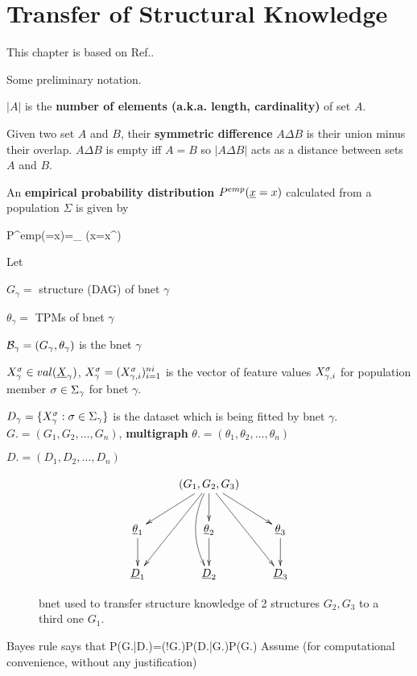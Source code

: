 \chapter{Transfer of Structural Knowledge}
\label{ch-transfer-struc}

This chapter is based on Ref.\cite{nic-transfer}.

Some preliminary notation.

$|A|$
is the {\bf number of elements (a.k.a. length, cardinality)} of set $A$.


Given two set $A$ and $B$, their 
{\bf symmetric difference} $A\Delta B$ is their union minus their overlap. $A\Delta B$ is empty iff $A=B$ so $|A\Delta B|$
acts as a distance between sets $A$ and $B$.

An {\bf empirical probability distribution} 
$P^{emp}(\rvx =x)$ calculated from a population $\Sigma$ is given by

\beq
P^{emp}(\rvx =x)=\sum_{\s\in \Sigma}
\indi(x=x^\s)
\eeq


Let 

$G_\gamma=$ structure (DAG)  of bnet $\gamma$

$\theta_\gamma=$ TPMs of bnet $\gamma$

${\cal B}_\gamma=(G_\gamma, \theta_\gamma)$ is the bnet $\gamma$

$X_\gamma^\s\in val(\rvX_\gamma)$, $X_\gamma^\sigma=(X_{\gamma, i}^\sigma)_{i=1}^{ni}$
is the vector of feature values 
$X_{\gamma, i}^\sigma$ for population member $\sigma\in\Sigma_\gamma$ for bnet $\gamma$.



$D_\gamma=\{X^\sigma_\gamma:\sigma\in \Sigma_\gamma\}$ is the dataset which is being fitted by bnet $\gamma$. 
$G. = (G_1, G_2, \ldots, G_n)$, {\bf multigraph
}
$\theta. = (\theta_1, \theta_2, \ldots, \theta_n)$

$D. = (D_1, D_2, \ldots, D_n)$

\begin{figure}[h!]
$$\xymatrix
{
&(G_1, G_2, G_3)\ar[dl]\ar[d]\ar[dr]
\ar[ddl]\ar[ddr]\ar@/_1pc/[dd]
\\
\rvtheta_1\ar[d]
&\rvtheta_2\ar[d]
&\rvtheta_3\ar[d]
\\
\rvD_1
&\rvD_2
&\rvD_3
}$$
\caption{bnet used to  transfer structure knowledge of 2 structures $G_2, G_3$ to a third one $G_1$.}
\label{fig-bnet-transfer-struc}
\end{figure}
Bayes rule says that
\beq
P(G.|D.)=\caln(!G.)P(D.|G.)P(G.)
\eeq
Assume (for computational convenience, without any justification)

